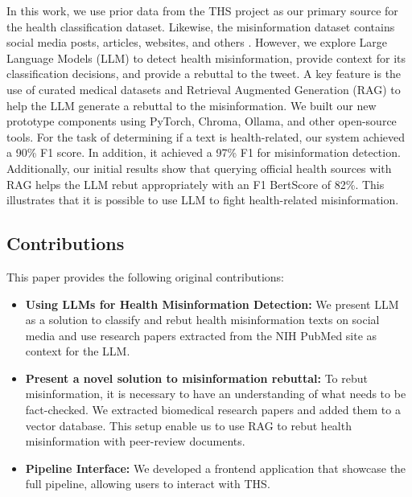 In this work, we use prior data from the THS project as our primary source for the health classification dataset. Likewise, the misinformation dataset contains social media posts, articles,
websites, and others \cite{stephencrone2022,coviddata,covidunesco}. 
However, we explore  Large Language Models (LLM)  to detect health misinformation, provide context for its classification decisions, and provide a rebuttal to the tweet.  A key feature is the use of 
curated medical datasets and Retrieval Augmented Generation (RAG) to help the LLM generate a rebuttal to the misinformation.
We built our new prototype components using PyTorch, Chroma, Ollama, and other open-source tools. For the task of determining if a text is health-related, our system achieved a 90\% F1 score. In addition, it achieved a 97\% F1 for misinformation detection. Additionally, our initial results show that querying  official health sources with RAG helps the LLM rebut appropriately  with an F1 BertScore of 82\%. This illustrates that it is possible to use LLM to fight health-related misinformation. 

\subsection{Contributions}
This paper provides the following original contributions:
\begin{itemize}
	\item{\textbf{Using LLMs for Health Misinformation Detection:}} 
	 We present LLM as a solution to classify and rebut health misinformation texts on social media and use research papers extracted from the NIH PubMed site as context for the LLM.
	\item{\textbf{Present a novel solution to misinformation rebuttal:}} To rebut misinformation, it is necessary to have an understanding of what needs to be fact-checked. 
	We extracted biomedical research papers and added them to a vector database. This setup enable us to use RAG to rebut health misinformation with peer-review documents.
	\item{\textbf{Pipeline Interface:}} We developed a frontend application that showcase the full pipeline, allowing users to interact with THS.
\end{itemize}


